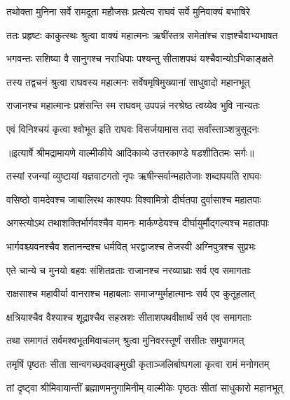 \twolineshloka
{तथोक्ता मुनिना सर्वे रामदूता महौजसः}
{प्रत्येत्य राघवं सर्वे मुनिवाक्यं बभाषिरे} %

\twolineshloka
{ततः प्रहृष्टः काकुत्स्थः श्रुत्वा वाक्यं महात्मनः}
{ऋषींस्तत्र समेतांश्च राज्ञश्चैवाभ्यभाषत} %

\twolineshloka
{भगवन्तः सशिष्या वै सानुगश्च नराधिपाः}
{पश्यन्तु सीताशपथं यश्चैवान्योऽभिकाङ्क्षते} %

\twolineshloka
{तस्य तद्वचनं श्रुत्वा राघवस्य महात्मनः}
{सर्वेषमृषिमुख्यानां साधुवादो महानभूत्} %

\twolineshloka
{राजानश्च महात्मानः प्रशंसन्ति स्म राघवम्}
{उपपन्नं नरश्रेष्ठ त्वय्येव भुवि नान्यतः} %

\twolineshloka
{एवं विनिश्चयं कृत्वा श्वोभूत इति राघवः}
{विसर्जयामास तदा सर्वांस्ताञ्शत्रुसूदनः} %


{॥इत्यार्षे श्रीमद्रामायणे वाल्मीकीये आदिकाव्ये उत्तरकाण्डे षडशीतितमः सर्गः॥}


\twolineshloka
{तस्यां रजन्यां व्युष्टायां यज्ञवाटगतो नृपः}
{ऋषीन्सर्वान्महातेजाः शब्दापयति राघवः} %

\twolineshloka
{वसिष्ठो वामदेवश्च जाबालिरथ काश्यपः}
{विश्वामित्रो दीर्घतपा दुर्वासाश्च महातपाः} %

\twolineshloka
{अगस्त्योऽथ तथाशक्तिर्भार्गवश्चैव वामनः}
{मार्कण्डेयश्च दीर्घायुर्मौद्गल्यश्च महातपाः} %

\twolineshloka
{भार्गवश्च्यवनश्चैव शतानन्दश्च धर्मवित्}
{भरद्वाजश्च तेजस्वी अग्निपुत्रश्च सुप्रभः} %

\twolineshloka
{एते चान्ये च मुनयो बहवः संशितव्रताः}
{राजानश्च नरव्याघ्राः सर्व एव समागताः} %

\twolineshloka
{राक्षसाश्च महावीर्या वानराश्च महाबलाः}
{समाजग्मुर्महात्मानः सर्व एव कुतूहलात्} %

\twolineshloka
{क्षत्रियाश्चैव वैश्याश्च शूद्राश्चैव सहस्रशः}
{सीताशपथवीक्षार्थं सर्व एव समागताः} %

\twolineshloka
{तथा समागतं सर्वमश्वभूतमिवाचलम्}
{श्रुत्वा मुनिवरस्तूर्णं ससीतः समुपागमत्} %

\twolineshloka
{तमृषिं पृष्ठतः सीता सान्वगच्छदवाङ्मुखी}
{कृताञ्जलिर्बाष्पगला कृत्वा रामं मनोगतम्} %

\twolineshloka
{तां दृष्ट्वा श्रीमिवायान्तीं ब्रह्माणमनुगामिनीम्}
{वाल्मीकेः पृष्ठतः सीतां साधुकारो महानभूत्} %

